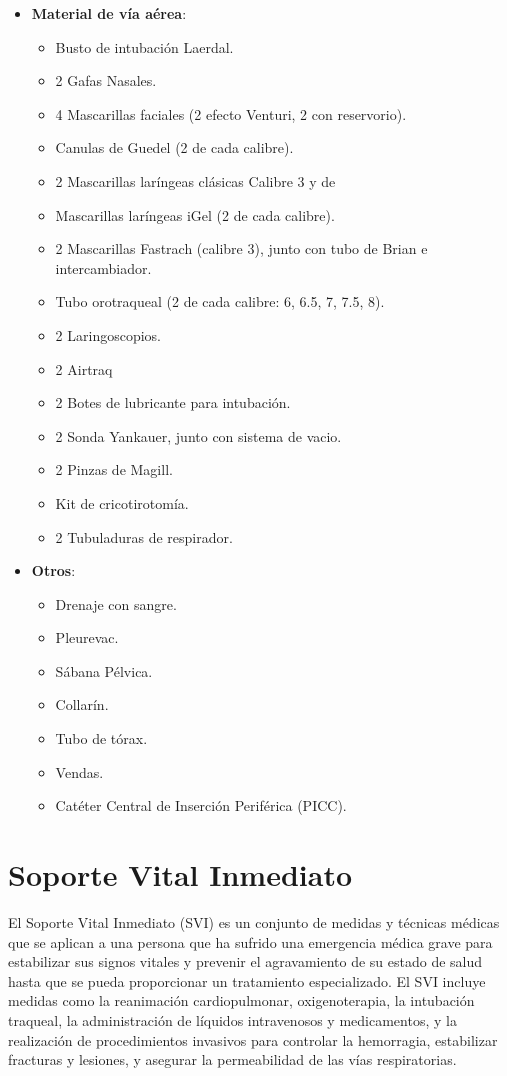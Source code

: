 \begin{itemize}[topsep=0pt, partopsep=0pt,itemsep=0pt,parsep=0pt]
    \item \textbf{Material de vía aérea}:
    \begin{itemize}[topsep=0pt, partopsep=0pt,itemsep=0pt,parsep=0pt]
        \item Busto de intubación Laerdal.
        \item 2 Gafas Nasales.
        \item 4 Mascarillas faciales (2 efecto Venturi, 2 con reservorio).
        \item Canulas de Guedel (2 de cada calibre).
        \item 2 Mascarillas laríngeas clásicas Calibre 3 y de 
        \item Mascarillas laríngeas iGel (2 de cada calibre).
        \item 2 Mascarillas Fastrach (calibre 3), junto con tubo de Brian e intercambiador.
        \item Tubo orotraqueal (2 de cada calibre: 6, 6.5, 7, 7.5, 8).
        \item 2 Laringoscopios.
        \item 2 Airtraq
        \item 2 Botes de lubricante para intubación.
        \item 2 Sonda Yankauer, junto con sistema de vacio.
        \item 2 Pinzas de Magill.
        \item Kit de cricotirotomía.
        \item 2 Tubuladuras de respirador.
    \end{itemize}
    \item \textbf{Otros}:
    \begin{itemize}[topsep=0pt, partopsep=0pt,itemsep=0pt,parsep=0pt]
        \item Drenaje con sangre.
        \item Pleurevac.
        \item Sábana Pélvica.
        \item Collarín.
        \item Tubo de tórax.
        \item Vendas.
        \item Catéter Central de Inserción Periférica (PICC).
    \end{itemize}
\end{itemize}
\clearpage
\section{Soporte Vital Inmediato}
El Soporte Vital Inmediato (SVI) es un conjunto de medidas y técnicas médicas que se aplican a una persona que ha sufrido una emergencia médica grave para estabilizar sus signos vitales y prevenir el agravamiento de su estado de salud hasta que se pueda proporcionar un tratamiento especializado. El SVI incluye medidas como la reanimación cardiopulmonar, oxigenoterapia, la intubación traqueal, la administración de líquidos intravenosos y medicamentos, y la realización de procedimientos invasivos para controlar la hemorragia, estabilizar fracturas y lesiones, y asegurar la permeabilidad de las vías respiratorias.

